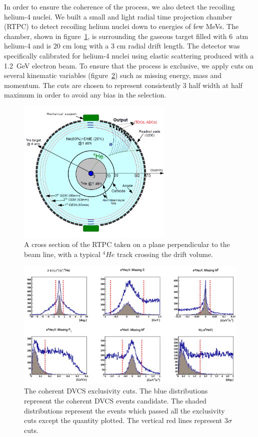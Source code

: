 \documentclass[%
 reprint,
 amsmath,amssymb,
 aps,
]{revtex4-1}
\begin{document}
In order to ensure the coherence of the process, we also detect the recoiling 
helium-4 nuclei. We built a small and light radial time projection chamber 
(RTPC) to detect recoiling helium nuclei down to energies of few MeVs. The 
chamber, shown in figure~\ref{fig:rtpc}, is surrounding the gaseous target 
filled with 6~atm helium-4 and is 20 cm long with a 3 cm radial drift 
length. The detector was specifically calibrated for helium-4 nuclei using 
elastic scattering produced with a 1.2~GeV electron beam.
To ensure that the process is exclusive, we apply cuts on 
several kinematic variables (figure~\ref{fig:exclu}) such as missing energy,
mass and momentum. The cuts are chosen to represent consistently 3 half width 
at half maximum in order to avoid any bias in the selection.


\begin{figure}[tb!]
\caption{\label{fig:rtpc} A cross section of the RTPC taken on a plane perpendicular to the 
beam line, with a typical $^4He$ track crossing the drift volume.}
\includegraphics[width=7.4cm]{RTPC.png}
\end{figure}


\begin{figure}[tb!]
\caption{\label{fig:exclu} The coherent DVCS exclusivity cuts. The blue 
distributions represent the coherent DVCS events candidate. The shaded 
distributions represent the events which passed all the exclusivity cuts 
except the quantity plotted. The vertical red lines represent $3\sigma$ cuts.}
\includegraphics[width=16.0cm]{all_coh_exc_cuts.png}
\end{figure}
\end{document}
